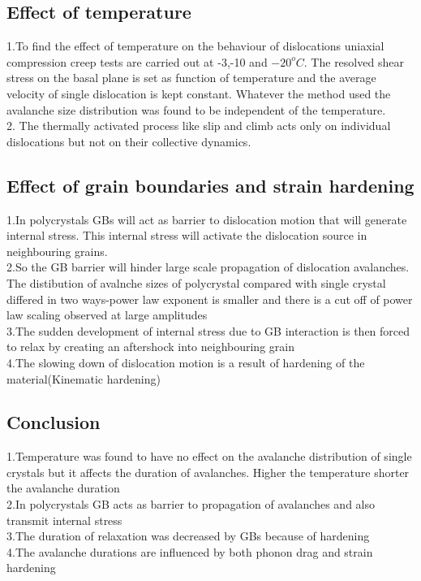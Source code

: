\documentclass[12pt]{article}
\begin{document}
\subsection{Effect of temperature}
1.\indent To find the effect of temperature on the behaviour of dislocations uniaxial compression creep tests are carried out at -3,-10 and $-20 ^o C$. The resolved shear stress on the basal plane is set as function of temperature and the average velocity of single dislocation is kept constant. Whatever the method used the avalanche size distribution was found to be independent of the temperature.\\
2. \indent The thermally activated process like slip and climb acts only on individual dislocations but not on their collective dynamics.\\
\subsection{Effect of grain boundaries and strain hardening}
1.\indent In polycrystals GBs will act as barrier to dislocation motion that will generate internal stress. This internal stress will activate the dislocation source in neighbouring grains.\\
2.\indent So the GB barrier will hinder large scale propagation of dislocation avalanches. The distibution of avalnche sizes of polycrystal compared with single crystal differed in two ways-power law exponent is smaller and there is a cut off of power law scaling observed at large amplitudes\\
3.\indent The sudden development of internal stress due to GB interaction is then forced to relax by creating an aftershock into neighbouring grain\\
4.\indent The slowing down of dislocation motion is a result of hardening of the material(Kinematic hardening)
\subsection{Conclusion}
1.\indent Temperature was found to have no effect on the avalanche distribution of single crystals but it affects the duration of avalanches. Higher the temperature shorter the avalanche duration\\
2.\indent In polycrystals GB acts as barrier to propagation of avalanches and also transmit internal stress\\
3.\indent The duration of relaxation was decreased by GBs because of hardening\\
4.\indent The avalanche durations are influenced by both phonon drag and strain hardening
\end{document}
